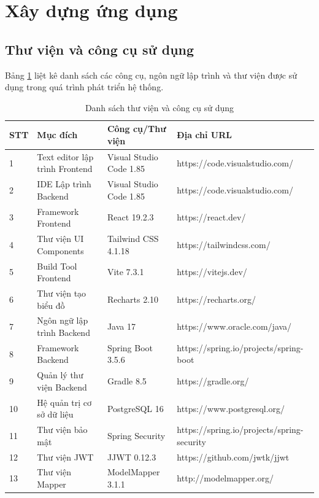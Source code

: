 \section{Xây dựng ứng dụng}
\subsection{Thư viện và công cụ sử dụng}

Bảng \ref{tab:tools_libs} liệt kê danh sách các công cụ, ngôn ngữ lập trình và thư viện được sử dụng trong quá trình phát triển hệ thống.

\begin{table}[H]
    \centering
    \caption{Danh sách thư viện và công cụ sử dụng}
    \label{tab:tools_libs}
    \begin{tabular}{|p{0.5cm}|p{3.5cm}|p{3.5cm}|p{6.5cm}|}
        \hline
        \textbf{STT} & \textbf{Mục đích} & \textbf{Công cụ/Thư viện} & \textbf{Địa chỉ URL} \\
        \hline
        1 & Text editor lập trình Frontend & Visual Studio Code 1.85 & https://code.visualstudio.com/ \\
        \hline
        2 & IDE Lập trình Backend & Visual Studio Code 1.85 & https://code.visualstudio.com/ \\
        \hline
        3 & Framework Frontend & React 19.2.3 & https://react.dev/ \\
        \hline
        4 & Thư viện UI Components & Tailwind CSS 4.1.18 & https://tailwindcss.com/ \\
        \hline
        5 & Build Tool Frontend & Vite 7.3.1 & https://vitejs.dev/ \\
        \hline
        6 & Thư viện tạo biểu đồ & Recharts 2.10 & https://recharts.org/ \\
        \hline
        7 & Ngôn ngữ lập trình Backend & Java 17 & https://www.oracle.com/java/ \\
        \hline
        8 & Framework Backend & Spring Boot 3.5.6 & https://spring.io/projects/spring-boot \\
        \hline
        9 & Quản lý thư viện Backend & Gradle 8.5 & https://gradle.org/ \\
        \hline
        10 & Hệ quản trị cơ sở dữ liệu & PostgreSQL 16 & https://www.postgresql.org/ \\
        \hline
        11 & Thư viện bảo mật & Spring Security & https://spring.io/projects/spring-security \\
        \hline
        12 & Thư viện JWT & JJWT 0.12.3 & https://github.com/jwtk/jjwt \\
        \hline
        13 & Thư viện Mapper & ModelMapper 3.1.1 & http://modelmapper.org/ \\
        \hline
    \end{tabular}
\end{table}

